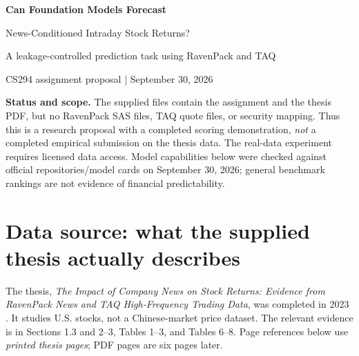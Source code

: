 \documentclass[11pt,letterpaper]{article}
\begin{document}
\begin{center}
{\Large\sffamily\bfseries\color{navy} Can Foundation Models Forecast\par News-Conditioned Intraday Stock Returns?}\par
\vspace{5pt}
{\large A leakage-controlled prediction task using RavenPack and TAQ}\par
\vspace{4pt}
CS294 assignment proposal \quad | \quad September 30, 2026
\end{center}

\begin{abstract}
This project tests whether pretrained tabular and time-series foundation models improve probabilistic forecasts of the next three 15-minute stock returns after company news. The data design comes from Qiuran Lyu's 2023 undergraduate thesis, which joins RavenPack news analytics to TAQ intraday quotes. I compare TabPFN/TabPFN-TS with Chronos, TimesFM, Moirai, and additional sequence-model alternatives under chronological, purged evaluation. The primary score is a proper quantile score, with CRPS as its distributional counterpart and mean squared error as a secondary measure. A derivation distinguishes the unknowable real-data Bayes optimum from a retrospective feature-cell optimum and a trivial outcome-lookup oracle. A runnable reference implementation validates the scoring and oracle comparison on synthetic data; no proprietary-data or foundation-model performance is claimed.
\end{abstract}

\textbf{Status and scope.} The supplied files contain the assignment and the thesis PDF, but no RavenPack SAS files, TAQ quote files, or security mapping. Thus this is a research proposal with a completed scoring demonstration, \emph{not} a completed empirical submission on the thesis data. The real-data experiment requires licensed data access. Model capabilities below were checked against official repositories/model cards on September 30, 2026; general benchmark rankings are not evidence of financial predictability.

\section{Data source: what the supplied thesis actually describes}
The thesis, \emph{The Impact of Company News on Stock Returns: Evidence from RavenPack News and TAQ High-Frequency Trading Data}, was completed in 2023 \cite{thesis}. It studies U.S. stocks, not a Chinese-market price dataset. The relevant evidence is in Sections 1.3 and 2--3, Tables 1--3, and Tables 6--8. Page references below use \emph{printed thesis pages}; PDF pages are six pages later.
\end{document}
